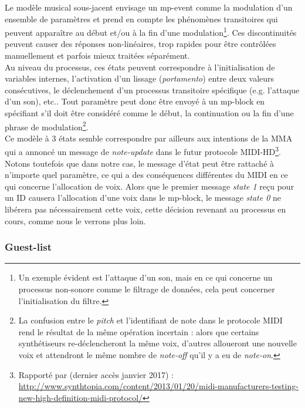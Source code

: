 \noindent Le modèle musical sous-jacent envisage un mp-event comme la modulation d'un ensemble de paramètres et prend en compte les phénomènes transitoires qui peuvent apparaître au début et/ou à la fin d'une modulation\footnote{ Un exemple évident est l'attaque d'un son, mais en ce qui concerne un processus non-sonore comme le filtrage de données, cela peut concerner l'initialisation du filtre.}. Ces discontinuités peuvent causer des réponses non-linéaires, trop rapides pour être contrôlées manuellement et parfois mieux traitées séparément.\\
\indent Au niveau du processus, ces états peuvent correspondre à l'initialisation de variables internes, l'activation d'un lissage (\textit{portamento}) entre deux valeurs consécutives, le déclenchement d'un processus transitoire spécifique (e.g. l'attaque d'un son), etc.. Tout paramètre peut donc être envoyé à un mp-block en spécifiant s'il doit être considéré comme le début, la continuation ou la fin d'une phrase de modulation\footnote{ La confusion entre le \textit{pitch} et l'identifiant de note dans le protocole \gls{MIDI} rend le résultat de la même opération incertain : alors que certains synthétiseurs re-déclencheront la même voix, d'autres alloueront une nouvelle voix et attendront le même nombre de \textit{note-off} qu'il y a eu de \textit{note-on}.}.\\
\indent Ce modèle à 3 états semble correspondre par ailleurs aux intentions de la \gls{MMA} qui a annoncé un message de \textit{note-update} dans le futur protocole MIDI-HD\footnote{ Rapporté par (dernier accès janvier 2017) : \url{http://www.synthtopia.com/content/2013/01/20/midi-manufacturers-testing-new-high-definition-midi-protocol/}}.\\
\indent Notons toutefois que dans notre cas, le message d'état peut être rattaché à n'importe quel paramètre, ce qui a des conséquences différentes du \gls{MIDI} en ce qui concerne l'allocation de voix. Alors que le premier message \textit{state 1} reçu pour un ID causera l'allocation d'une voix dans le mp-block, le message \textit{state 0} ne libérera pas nécessairement cette voix, cette décision revenant au processus en cours, comme nous le verrons plus loin.

\subsubsection{Guest-list}

